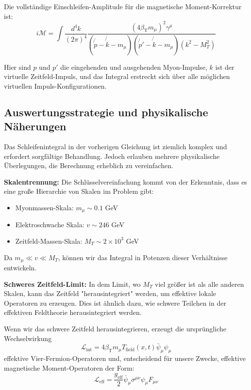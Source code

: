 \documentclass[12pt,a4paper]{article}
\newcommand{\Tfield}{T_{\text{field}}(x,t)}
\newcommand{\betaT}{\beta_{\text{T}}}
\begin{document}
	Die vollständige Einschleifen-Amplitude für die magnetische Moment-Korrektur ist:
	\begin{equation}
		i\mathcal{M} = \int \frac{d^4k}{(2\pi)^4} \frac{(4\betaT m_\mu)^2 \gamma^\mu}{(\not{p} - \not{k} - m_\mu)(\not{p}' - \not{k} - m_\mu)(k^2 - M_T^2)}
	\end{equation}
	
	Hier sind $p$ und $p'$ die eingehenden und ausgehenden Myon-Impulse, $k$ ist der virtuelle Zeitfeld-Impuls, und das Integral erstreckt sich über alle möglichen virtuellen Impuls-Konfigurationen.
	
	\subsection{Auswertungsstrategie und physikalische Näherungen}
	
	Das Schleifenintegral in der vorherigen Gleichung ist ziemlich komplex und erfordert sorgfältige Behandlung. Jedoch erlauben mehrere physikalische Überlegungen, die Berechnung erheblich zu vereinfachen.
	
	\textbf{Skalentrennung:} Die Schlüsselvereinfachung kommt von der Erkenntnis, dass es eine große Hierarchie von Skalen im Problem gibt:
	\begin{itemize}
		\item Myonmassen-Skala: $m_\mu \sim 0.1$ GeV
		\item Elektroschwache Skala: $v \sim 246$ GeV  
		\item Zeitfeld-Massen-Skala: $M_T \sim 2 \times 10^3$ GeV
	\end{itemize}
	
	Da $m_\mu \ll v \ll M_T$, können wir das Integral in Potenzen dieser Verhältnisse entwickeln.
	
	\textbf{Schweres Zeitfeld-Limit:} In dem Limit, wo $M_T$ viel größer ist als alle anderen Skalen, kann das Zeitfeld "herausintegriert" werden, um effektive lokale Operatoren zu erzeugen. Dies ist ähnlich dazu, wie schwere Teilchen in der effektiven Feldtheorie herausintegriert werden.
	
	Wenn wir das schwere Zeitfeld herausintegrieren, erzeugt die ursprüngliche Wechselwirkung
	\begin{equation}
		\mathcal{L}_{\text{int}} = 4\betaT m_\mu \Tfield \bar{\psi}_\mu \psi_\mu
	\end{equation}
	effektive Vier-Fermion-Operatoren und, entscheidend für unsere Zwecke, effektive magnetische Moment-Operatoren der Form:
	\begin{equation}
		\mathcal{L}_{\text{eff}} = \frac{g_{\text{eff}}}{2} \bar{\psi}_\mu \sigma^{\mu\nu} \psi_\mu F_{\mu\nu}
	\end{equation}
	
\end{document}
